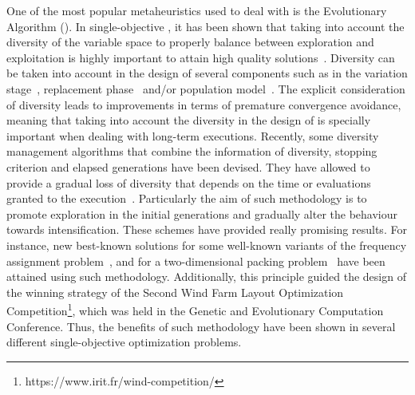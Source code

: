 One of the most popular metaheuristics used to deal with \MOPS{} is the Evolutionary Algorithm (\EA{}).
%
In single-objective \EAS{}, it has been shown that taking into account the diversity of the variable space
to properly balance between exploration and exploitation is highly important to attain high quality 
solutions~\cite{Joel:BALANCE_DIVERSITY}.
%
Diversity can be taken into account in the design of several components such as in the variation 
stage~\cite{Joel:FUZZY_ADAPTIVE_GA,Joel:CROSSOVER_DIVERSITY}, replacement phase~\cite{Joel:MULTI_DYNAMIC} 
and/or population model~\cite{Joel:SAWTOOTH}.
%
%
The explicit consideration of diversity leads to improvements in terms of premature convergence avoidance, 
meaning that taking into account the diversity in the design of \EAS{} is specially important when dealing 
with long-term executions.
%
Recently, some diversity management algorithms that combine the information of diversity, stopping criterion and elapsed 
generations have been devised.
%
They have allowed to provide a gradual loss of diversity that depends on the time or evaluations granted to the 
execution~\cite{Joel:MULTI_DYNAMIC}.
%
Particularly the aim of such methodology is to promote exploration in the initial generations and gradually alter the 
behaviour towards intensification.
%
These schemes have provided really promising results.
%
For instance, new best-known solutions for some well-known variants of the frequency assignment problem~\cite{Segura:17},
and for a two-dimensional packing problem~\cite{Joel:MULTI_DYNAMIC} have been attained using such methodology.
%
Additionally, this principle guided the design of the winning strategy of the Second Wind Farm Layout Optimization 
Competition\footnote{https://www.irit.fr/wind-competition/}, which was held in the Genetic and Evolutionary 
Computation Conference.
%
Thus, the benefits of such methodology have been shown in several different single-objective optimization problems.

